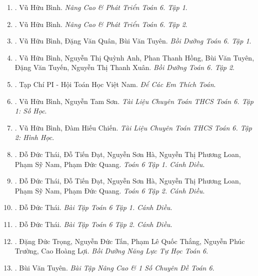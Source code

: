 \documentclass{article}
\begin{document}
\begin{enumerate}
	\item \cite{Binh_Toan_6_tap_1}. {\sc Vũ Hữu Bình}. {\it Nâng Cao \& Phát Triển Toán 6. Tập 1}.\hfill{\sf[done]}

	\item \cite{Binh_Toan_6_tap_2}. {\sc Vũ Hữu Bình}. {\it Nâng Cao \& Phát Triển Toán 6. Tập 2}.\hfill{\sf[done]}

	\item \cite{Binh_boi_duong_Toan_6_tap_1}. {\sc Vũ Hữu Bình, Đặng Văn Quân, Bùi Văn Tuyên}. {\it Bồi Dưỡng Toán 6. Tập 1}.\hfill{\sf[done]}

	\item \cite{Binh_boi_duong_Toan_6_tap_2}. {\sc Vũ Hữu Bình, Nguyễn Thị Quỳnh Anh, Phan Thanh Hồng, Bùi Văn Tuyên, Đặng Văn Tuyến, Nguyễn Thị Thanh Xuân}. {\it Bồi Dưỡng Toán 6. Tập 2}.\hfill{\sf[done]}

	\item \cite{PI_thich_toan}. {\sc Tạp Chí PI - Hội Toán Học Việt Nam}. {\it Để Các Em Thích Toán}.\hfill{\sf[reading]}

	\item \cite{TLCT_THCS_Toan_6_so_hoc}. {\sc Vũ Hữu Bình, Nguyễn Tam Sơn}. {\it Tài Liệu Chuyên Toán THCS Toán 6. Tập 1: Số Học}.\hfill{\sf[done]}

	\item \cite{TLCT_THCS_Toan_6_hinh_hoc}. {\sc Vũ Hữu Bình, Đàm Hiếu Chiến}. {\it Tài Liệu Chuyên Toán THCS Toán 6. Tập 2: Hình Học}.\hfill{\sf[done]}

	\item \cite{SGK_Toan_6_CD_tap_1}. {\sc Đỗ Đức Thái, Đỗ Tiến Đạt, Nguyễn Sơn Hà, Nguyễn Thị Phương Loan, Phạm Sỹ Nam, Phạm Đức Quang}. {\it Toán 6 Tập 1. Cánh Diều}.\hfill{\sf[done]}

	\item \cite{SGK_Toan_6_CD_tap_2}. {\sc Đỗ Đức Thái, Đỗ Tiến Đạt, Nguyễn Sơn Hà, Nguyễn Thị Phương Loan, Phạm Sỹ Nam, Phạm Đức Quang}. {\it Toán 6 Tập 2. Cánh Diều}.\hfill{\sf[done]}

	\item \cite{SBT_Toan_6_CD_tap_1}. {\sc Đỗ Đức Thái}. {\it Bài Tập Toán 6 Tập 1. Cánh Diều}.\hfill{\sf[done]}

	\item \cite{SBT_Toan_6_CD_tap_2}. {\sc Đỗ Đức Thái}. {\it Bài Tập Toán 6 Tập 2. Cánh Diều}.\hfill{\sf[done]}

	\item \cite{Trong_Toan_6}. {\sc Đặng Đức Trọng, Nguyễn Đức Tấn, Phạm Lê Quốc Thắng, Nguyễn Phúc Trường, Cao Hoàng Lợi}. {\it Bồi Dưỡng Năng Lực Tự Học Toán 6}.\hfill{\sf[reading]}

	\item \cite{Tuyen_Toan_6}. {\sc Bùi Văn Tuyên}. {\it Bài Tập Nâng Cao \& 1 Số Chuyên Đề Toán 6}.\hfill{\sf[done]}
\end{enumerate}
\end{document}
